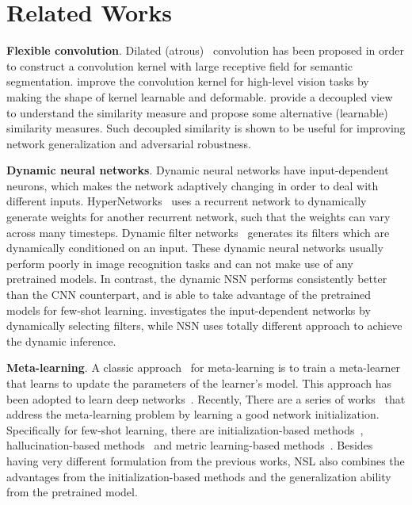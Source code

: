\section{Related Works}

\textbf{Flexible convolution}. Dilated (atrous)~\cite{yu2015multi,chen2018deeplab} convolution has been proposed in order to construct a convolution kernel with large receptive field for semantic segmentation. \cite{dai2017deformable,jeon2017active} improve the convolution kernel for high-level vision tasks by making the shape of kernel learnable and deformable. \cite{liu2017hyper,liu2018decoupled} provide a decoupled view to understand the similarity measure and propose some alternative (learnable) similarity measures. Such decoupled similarity is shown to be useful for improving network generalization and adversarial robustness.
\par

\textbf{Dynamic neural networks}. Dynamic neural networks have  input-dependent neurons, which makes the network adaptively changing in order to deal with different inputs. HyperNetworks~\cite{ha2016hypernetworks} uses a recurrent network to dynamically generate weights for another recurrent network, such that the weights can vary across many timesteps. Dynamic filter networks~\cite{jia2016dynamic} generates its filters which are dynamically conditioned on an input. These dynamic neural networks usually perform poorly in image recognition tasks and can not make use of any pretrained models. In contrast, the dynamic NSN performs consistently better than the CNN counterpart, and is able to take advantage of the pretrained models for few-shot learning. \cite{chen2018gaternet} investigates the input-dependent networks by dynamically selecting filters, while NSN uses totally different approach to achieve the dynamic inference.
\par

\textbf{Meta-learning}.  A classic approach~\cite{bengio1990learning,schmidhuber1992learning} for meta-learning is to train a meta-learner that learns to update the parameters of the learner’s model. This approach has been adopted to learn deep networks~\cite{andrychowicz2016learning,li2016learning,munkhdalai2017meta,shaw2019meta}. Recently, There are a series of works~\cite{ravi2016optimization,finn2017model} that address the meta-learning problem by learning a good network initialization. Specifically for few-shot learning, there are initialization-based methods~\cite{munkhdalai2017meta,ravi2016optimization,finn2017model,chen2018a}, hallucination-based methods~\cite{wang2018low,hariharan2017low,antoniou2017data} and metric learning-based methods~\cite{vinyals2016matching,snell2017prototypical,sung2018learning}. Besides having very different formulation from the previous works, NSL also combines the advantages from the initialization-based methods and the generalization ability from the pretrained model.

